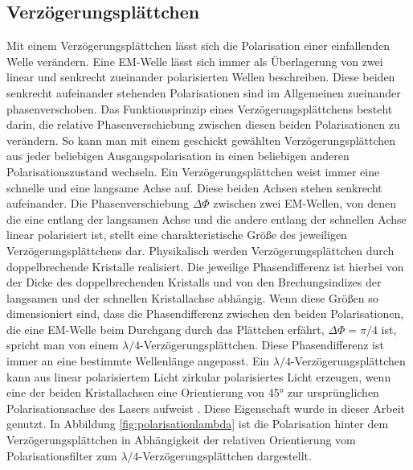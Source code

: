 \documentclass[a4paper, titlepage,  ngerman, fullpage]{book}
\begin{document}
	\subsection{Verzögerungsplättchen}
	Mit einem Verzögerungsplättchen lässt sich die Polarisation einer einfallenden Welle verändern. Eine EM-Welle lässt sich immer als Überlagerung von zwei linear und senkrecht zueinander polarisierten Wellen beschreiben. Diese beiden senkrecht aufeinander stehenden Polarisationen sind im Allgemeinen zueinander phasenverschoben. Das Funktionsprinzip eines Verzögerungsplättchens besteht darin, die relative Phasenverschiebung zwischen diesen beiden Polarisationen zu verändern. So kann man mit einem geschickt gewählten Verzögerungsplättchen aus jeder beliebigen Ausgangspolarisation in einen beliebigen anderen Polarisationszustand wechseln. Ein Verzögerungsplättchen weist immer eine schnelle und eine langsame Achse auf. Diese beiden Achsen stehen senkrecht aufeinander. Die Phasenverschiebung $\Delta\Phi$ zwischen zwei EM-Wellen, von denen die eine entlang der langsamen Achse und die andere entlang der schnellen Achse linear polarisiert ist, stellt eine charakteristische Größe des jeweiligen Verzögerungsplättchens dar. Physikalisch  werden Verzögerungsplättchen durch doppelbrechende Kristalle realisiert. Die jeweilige Phasendifferenz ist hierbei von der Dicke des doppelbrechenden Kristalls und von den Brechungsindizes der langsamen und der schnellen Kristallachse abhängig. Wenn diese Größen so dimensioniert sind, dass die Phasendifferenz zwischen den beiden Polarisationen, die eine EM-Welle beim Durchgang durch das Plättchen erfährt, $\Delta \Phi = \pi /4 $ ist, spricht man von einem  $\lambda /4$-Verzögerungsplättchen. Diese Phasendifferenz ist immer an eine bestimmte Wellenlänge angepasst.  Ein $\lambda /4$-Verzögerungsplättchen kann aus linear polarisiertem Licht zirkular polarisiertes Licht erzeugen, wenn eine der beiden Kristallachsen eine Orientierung von 45° zur ursprünglichen Polarisationsachse des Lasers aufweist \cite{Hecht.2018}. Diese Eigenschaft wurde in dieser Arbeit genutzt. In Abbildung \ref{fig:polarisationlambda} ist die Polarisation hinter dem Verzögerungsplättchen in Abhängigkeit der relativen Orientierung vom Polarisationsfilter zum $\lambda /4$-Verzögerungsplättchen dargestellt. 
\end{document}
